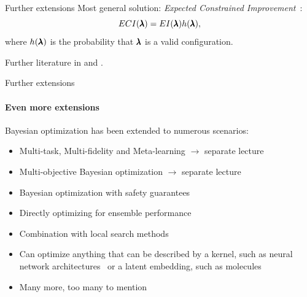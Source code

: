 \begin{frame}[c]{Further extensions}
Most general solution: \emph{Expected Constrained Improvement}~:
\vspace{-0.1cm}
\begin{equation}
    ECI(\pmb{\lambda}) = EI(\pmb{\lambda})h(\pmb{\lambda}),
\end{equation}
\vspace{-0.1cm}
where $h(\pmb{\lambda})$ is the probability that $\pmb{\lambda}$ is a valid configuration.

\vspace{0.1cm}
Further literature in  and .

\end{frame}
\begin{frame}[c]{Further extensions}
\framesubtitle{Even more extensions}
Bayesian optimization has been extended to numerous scenarios:
\begin{itemize}
    \item Multi-task, Multi-fidelity and Meta-learning $\rightarrow$ separate lecture
    \item Multi-objective Bayesian optimization $\rightarrow$ separate lecture
    \item Bayesian optimization with safety guarantees~
    \item Directly optimizing for ensemble performance~
    \item Combination with local search methods~
    \item Can optimize anything that can be described by a kernel, such as neural network architectures~ or a latent embedding, such as molecules~
    \item Many more, too many to mention
\end{itemize}
  
\end{frame}
